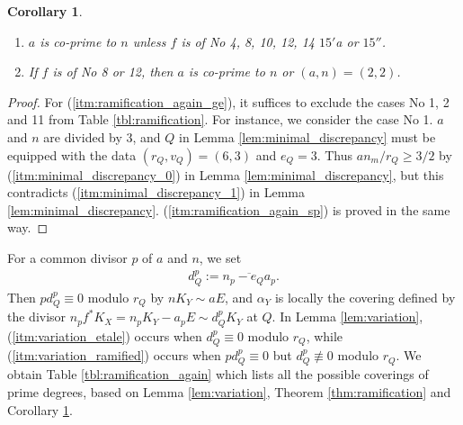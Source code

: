\documentclass[a4paper,11pt]{amsart}
\newtheorem{corollary}[theorem]{Corollary}
\theoremstyle{definition}
\theoremstyle{remark}
\numberwithin{equation}{section}
\begin{document}
\begin{corollary}\label{cor:ramification_again}
\begin{enumerate}
\item
$a$ is co-prime to $n$ unless $f$ is of No 4, 8, 10, 12, 14 $\textrm{15}'$a
or $\textrm{15}''$.\label{itm:ramification_again_ge}
\item
If $f$ is of No 8 or 12,
then $a$ is co-prime to $n$ or $(a,n)=(2,2)$.\label{itm:ramification_again_sp}
\end{enumerate}
\end{corollary}

\begin{proof}
For (\ref{itm:ramification_again_ge}),
it suffices to exclude the cases No 1, 2 and 11
from Table \ref{tbl:ramification}.
For instance, we consider the case No 1.
$a$ and $n$ are divided by $3$,
and $Q$ in Lemma \ref{lem:minimal_discrepancy} must be equipped with
the data $(r_Q, v_Q)=(6, 3)$ and $e_Q=3$.
Thus $an_m/r_Q \ge 3/2$ by
(\ref{itm:minimal_discrepancy_0}) in Lemma \ref{lem:minimal_discrepancy},
but this contradicts
(\ref{itm:minimal_discrepancy_1}) in Lemma \ref{lem:minimal_discrepancy}.
(\ref{itm:ramification_again_sp}) is proved in the same way.
\end{proof}

For a common divisor $p$ of $a$ and $n$,
we set
\begin{align*}
d_Q^p:=\overline{n_p-e_Qa_p}.
\end{align*}
Then $pd_Q^p \equiv 0$ modulo $r_Q$ by $nK_Y \sim aE$,
and $\alpha_Y$ is locally the covering defined by the divisor
$n_pf^*K_X=n_pK_Y-a_pE \sim d_Q^pK_Y$ at $Q$.
In Lemma \ref{lem:variation},
(\ref{itm:variation_etale}) occurs when $d_Q^p \equiv 0$ modulo $r_Q$,
while (\ref{itm:variation_ramified}) occurs when
$pd_Q^p \equiv 0$ but $d_Q^p \not\equiv 0$ modulo $r_Q$.
We obtain Table \ref{tbl:ramification_again} which lists
all the possible coverings of prime degrees,
based on Lemma \ref{lem:variation},
Theorem \ref{thm:ramification} and Corollary \ref{cor:ramification_again}.
\end{document}
